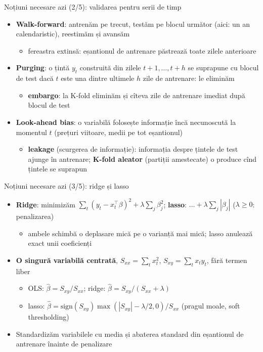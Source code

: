 \begin{frame}{Noțiuni necesare azi (2/5): validarea pentru serii de timp}
\itemsize{\small}
\begin{itemize}
    \item \textbf{Walk-forward}: antrenăm pe trecut, testăm pe blocul următor (aici: un an calendaristic), reestimăm și avansăm
    \begin{itemize}
        \item fereastra extinsă: eșantionul de antrenare păstrează toate zilele anterioare
    \end{itemize}
    \item \textbf{Purging}: o țintă $y_t$ construită din zilele $t+1, \dots, t+h$ se suprapune cu blocul de test dacă $t$ este una dintre ultimele $h$ zile de antrenare: le eliminăm
    \begin{itemize}
        \item \textbf{embargo}: la K-fold eliminăm și cîteva zile de antrenare imediat după blocul de test
    \end{itemize}
    \item \textbf{Look-ahead bias}: o variabilă folosește informație încă necunoscută la momentul $t$ (prețuri viitoare, medii pe tot eșantionul)
    \begin{itemize}
        \item \textbf{leakage} (scurgerea de informație): informația despre țintele de test ajunge în antrenare; \textbf{K-fold aleator} (partiții amestecate) o produce cînd țintele se suprapun
    \end{itemize}
\end{itemize}
\end{frame}

\begin{frame}{Noțiuni necesare azi (3/5): ridge și lasso}
\itemsize{\small}
\begin{itemize}
    \item \textbf{Ridge}: minimizăm $\sum_t (y_t - x_t^\top\beta)^2 + \lambda\sum_j \beta_j^2$; \textbf{lasso}: $\dots + \lambda\sum_j |\beta_j|$ ($\lambda \ge 0$: penalizarea)
    \begin{itemize}
        \item ambele schimbă o deplasare mică pe o varianță mai mică; lasso anulează exact unii coeficienți
    \end{itemize}
    \item \textbf{O singură variabilă centrată}, $S_{xx} = \sum_t x_t^2$, $S_{xy} = \sum_t x_ty_t$, fără termen liber
    \begin{itemize}
        \item OLS: $\hat\beta = S_{xy}/S_{xx}$; ridge: $\hat\beta = S_{xy}/(S_{xx} + \lambda)$
        \item lasso: $\hat\beta = \mathrm{sign}(S_{xy})\max(|S_{xy}| - \lambda/2, 0)/S_{xx}$ (pragul moale, soft thresholding)
    \end{itemize}
    \item Standardizăm variabilele cu media și abaterea standard din eșantionul de antrenare înainte de penalizare
\end{itemize}
\end{frame}

